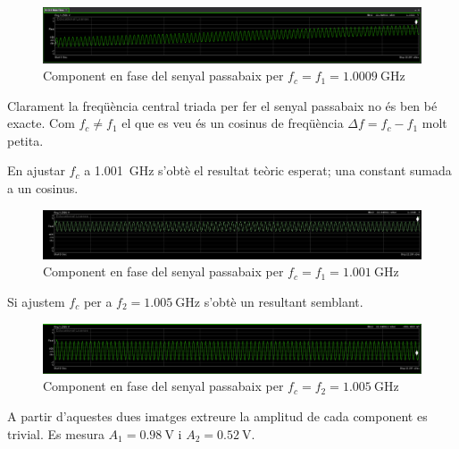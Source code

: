 \documentclass[catalan, a4paper, nobib]{tufte-handout}
\begin{document}

\begin{figure}[!h]
  \begin{center}
    \includegraphics[width=465px]{q3_1.png}
  \end{center}
  \caption{Component en fase del senyal passabaix per $f_c=f_1=\qty{1.0009}{\giga\hertz}$}
\end{figure}

Clarament la freqüència central triada per fer el senyal passabaix no és ben bé exacte. Com $f_c \ne f_1$ el que es veu és un cosinus de freqüència $\Delta f = f_c - f_1$ molt petita.

\newpage

En ajustar $f_c$ a \qty{1.001}{\giga\hertz} s'obtè el resultat teòric esperat; una constant sumada a un cosinus.

\begin{figure}[!h]
  \begin{center}
    \includegraphics[width=465px]{q3_2.png}
  \end{center}
  \caption{Component en fase del senyal passabaix per $f_c=f_1=\qty{1.001}{\giga\hertz}$}
\end{figure}

Si ajustem $f_c$ per a $f_2 = \qty{1.005}{\giga\hertz}$ s'obtè un resultant semblant.

\begin{figure}[!h]
  \begin{center}
    \includegraphics[width=465px]{q3_3.png}
  \end{center}
  \caption{Component en fase del senyal passabaix per $f_c=f_2=\qty{1.005}{\giga\hertz}$}
\end{figure}

A partir d'aquestes dues imatges extreure la amplitud de cada component es trivial. Es mesura $A_1=\qty{0.98}{\volt}$ i $A_2=\qty{0.52}{\volt}$.
\end{document}
